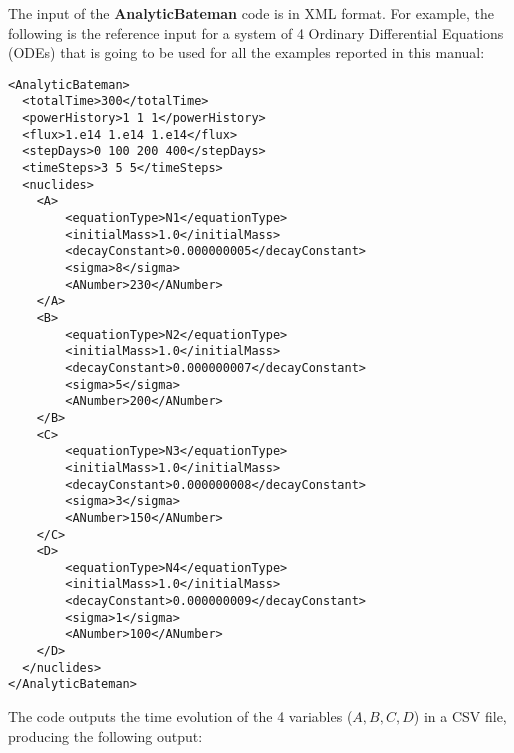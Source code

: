 The input of the \textbf{AnalyticBateman} code is in XML format. 
For example, the following is the reference input for a system of 4 Ordinary Differential Equations (ODEs) that is going to be used for all the examples reported in this manual: 

\begin{lstlisting}[style=XML]
<AnalyticBateman>
  <totalTime>300</totalTime>
  <powerHistory>1 1 1</powerHistory>
  <flux>1.e14 1.e14 1.e14</flux>
  <stepDays>0 100 200 400</stepDays>
  <timeSteps>3 5 5</timeSteps>
  <nuclides>
    <A>
        <equationType>N1</equationType>
        <initialMass>1.0</initialMass>
        <decayConstant>0.000000005</decayConstant>
        <sigma>8</sigma>
        <ANumber>230</ANumber>
    </A>
    <B>
        <equationType>N2</equationType>
        <initialMass>1.0</initialMass>
        <decayConstant>0.000000007</decayConstant>
        <sigma>5</sigma>
        <ANumber>200</ANumber>
    </B>
    <C>
        <equationType>N3</equationType>
        <initialMass>1.0</initialMass>
        <decayConstant>0.000000008</decayConstant>
        <sigma>3</sigma>
        <ANumber>150</ANumber>
    </C>
    <D>
        <equationType>N4</equationType>
        <initialMass>1.0</initialMass>
        <decayConstant>0.000000009</decayConstant>
        <sigma>1</sigma>
        <ANumber>100</ANumber>
    </D>
  </nuclides>
</AnalyticBateman>
\end{lstlisting}
The code outputs the time evolution of the 4 variables ($A,B,C,D$) in a CSV file, producing the following output:
